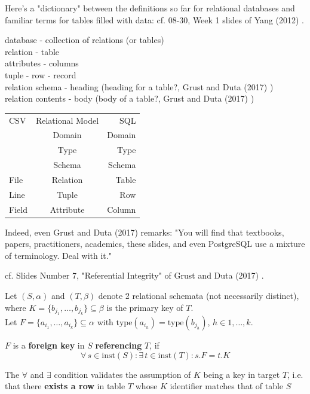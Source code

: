 Here's a "dictionary" between the definitions so far for relational databases and familiar terms for tables filled with data: cf. 08-30, Week 1 slides of Yang (2012) \cite{agat:Yang2012}.

database - collection of relations (or tables) \\
relation - table \\
attributes - columns \\
tuple - row - record \\
relation schema - heading (heading for a table?, Grust and Duta (2017) \cite{agat:GrDu2017}) \\
relation contents - body (body of a table?, Grust and Duta (2017) \cite{agat:GrDu2017})

\begin{tabular}{l c r}
	CSV & Relational Model & SQL \\
	& Domain & Domain \\ 
	& Type & Type \\
	& Schema & Schema \\
	File & Relation & Table \\
	Line & Tuple & Row \\
	Field & Attribute & Column
\end{tabular}

Indeed, even Grust and Duta (2017) \cite{agat:GrDu2017} remarks: "You will find that textbooks, papers, practitioners, academics, these slides, and even PostgreSQL use a mixture of terminology. Deal with it."


cf. Slides Number 7, "Referential Integrity" of Grust and Duta (2017) \cite{agat:GrDu2017}.

\begin{definition}
	Let $(S, \alpha)$ and $(T, \beta)$ denote 2 relational schemata (not necessarily distinct), \\
	where $K = \lbrace b_{j_1}, \dots , b_{j_k} \rbrace \subseteq \beta$ is the primary key of $T$. \\
	Let $F = \lbrace a_{i_1}, \dots , a_{i_k} \rbrace \subseteq \alpha $ with $\text{type}(a_{i_h}) = \text{type}(b_{j_h})$, $h \in 1, \dots, k$. 
	
	$F$ is a \textbf{foreign key} in $S$ \textbf{referencing} $T$, if 
	\[
	\forall \, s \in \text{inst}(S) : \exists \, t \in \text{inst}(T) : s.F = t.K
	\]
\end{definition} 
The $\forall$ and $\exists $ condition validates the assumption of $K$ being a key in target $T$, i.e. that there \textbf{exists a row} in table $T$ whose $K$ identifier matches that of table $S$

